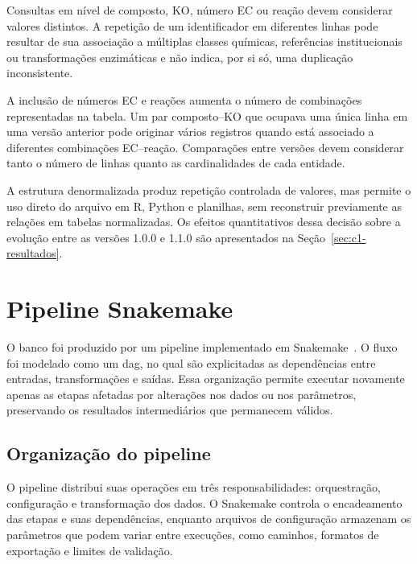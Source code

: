 Consultas em nível de composto, KO, número EC ou reação devem considerar
valores distintos. A repetição de um identificador em diferentes linhas pode
resultar de sua associação a múltiplas classes químicas, referências
institucionais ou transformações enzimáticas e não indica, por si só, uma
duplicação inconsistente.

A inclusão de números EC e reações aumenta o número de combinações
representadas na tabela. Um par composto--KO que ocupava uma única linha em
uma versão anterior pode originar vários registros quando está associado a
diferentes combinações EC--reação. Comparações entre versões devem considerar
tanto o número de linhas quanto as cardinalidades de cada entidade.

A estrutura denormalizada produz repetição controlada de valores, mas permite
o uso direto do arquivo em R, Python e planilhas, sem reconstruir previamente
as relações em tabelas normalizadas. Os efeitos quantitativos dessa decisão
sobre a evolução entre as versões 1.0.0 e 1.1.0 são apresentados na
Seção~\ref{sec:c1-resultados}.

\section{Pipeline Snakemake}
\label{sec:c1-snakemake}

O banco foi produzido por um pipeline implementado em
Snakemake~\citep{molder2025snakemake}. O fluxo foi modelado como um
\gls{dag}, no qual são explicitadas as dependências entre entradas,
transformações e saídas. Essa organização permite executar novamente apenas
as etapas afetadas por alterações nos dados ou nos parâmetros, preservando os
resultados intermediários que permanecem válidos.

\subsection{Organização do pipeline}

O pipeline distribui suas operações em três responsabilidades:
orquestração, configuração e transformação dos dados. O Snakemake controla o
encadeamento das etapas e suas dependências, enquanto arquivos de configuração
armazenam os parâmetros que podem variar entre execuções, como caminhos,
formatos de exportação e limites de validação.

